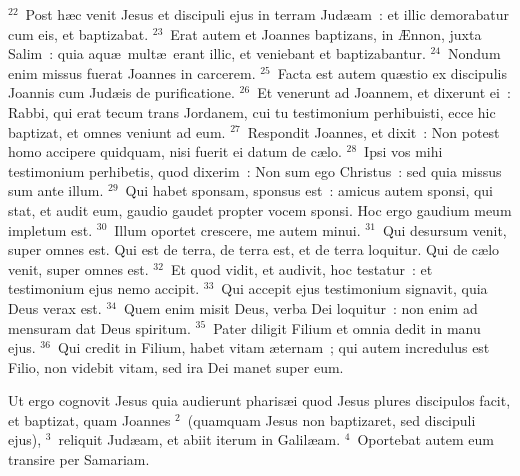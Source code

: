 ${}^{22}$~Post h\ae c venit Jesus et discipuli ejus in terram Jud\ae am~: et illic demorabatur cum eis, et baptizabat.
${}^{23}$~Erat autem et Joannes baptizans, in \AE nnon, juxta Salim~: quia aqu\ae\ mult\ae\ erant illic, et veniebant et baptizabantur.
${}^{24}$~Nondum enim missus fuerat Joannes in carcerem.
${}^{25}$~Facta est autem qu\ae stio ex discipulis Joannis cum Jud\ae is de purificatione.
${}^{26}$~Et venerunt ad Joannem, et dixerunt ei~: Rabbi, qui erat tecum trans Jordanem, cui tu testimonium perhibuisti, ecce hic baptizat, et omnes veniunt ad eum.
${}^{27}$~Respondit Joannes, et dixit~: Non potest homo accipere quidquam, nisi fuerit ei datum de c\ae lo.
${}^{28}$~Ipsi vos mihi testimonium perhibetis, quod dixerim~: Non sum ego Christus~: sed quia missus sum ante illum.
${}^{29}$~Qui habet sponsam, sponsus est~: amicus autem sponsi, qui stat, et audit eum, gaudio gaudet propter vocem sponsi. Hoc ergo gaudium meum impletum est.
${}^{30}$~Illum oportet crescere, me autem minui.
${}^{31}$~Qui desursum venit, super omnes est. Qui est de terra, de terra est, et de terra loquitur. Qui de c\ae lo venit, super omnes est.
${}^{32}$~Et quod vidit, et audivit, hoc testatur~: et testimonium ejus nemo accipit.
${}^{33}$~Qui accepit ejus testimonium signavit, quia Deus verax est.
${}^{34}$~Quem enim misit Deus, verba Dei loquitur~: non enim ad mensuram dat Deus spiritum.
${}^{35}$~Pater diligit Filium et omnia dedit in manu ejus.
${}^{36}$~Qui credit in Filium, habet vitam \ae ternam~; qui autem incredulus est Filio, non videbit vitam, sed ira Dei manet super eum.

\lettrine[lines=10,image=true,loversize=0.05,lraise=-0.03]{U}{}t ergo cognovit Jesus quia audierunt pharis\ae i quod Jesus plures discipulos facit, et baptizat, quam Joannes
${}^{2}$~(quamquam Jesus non baptizaret, sed discipuli ejus),
${}^{3}$~reliquit Jud\ae am, et abiit iterum in Galil\ae am.
${}^{4}$~Oportebat autem eum transire per Samariam.


